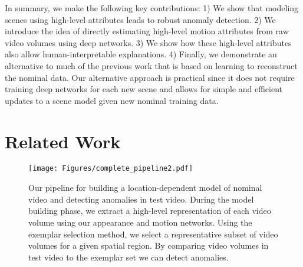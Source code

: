 In summary, we make the following key contributions:  1) We show that modeling scenes using high-level attributes leads to robust anomaly detection.
2) We introduce the idea of directly estimating high-level motion attributes from raw video volumes using deep networks.
3) We show how these high-level attributes also allow human-interpretable explanations.
4) Finally, we demonstrate an alternative to much of the previous work that is based on learning to reconstruct the nominal data.  Our alternative approach is practical since it does not require training deep networks for each new scene and allows for simple and efficient updates to a scene model given new nominal training data.






\section{Related Work}
\label{sec:related}

\begin{figure*}[]
    \centering
    \texttt{[image: Figures/complete\_pipeline2.pdf]}
    \vspace{-10pt}
    \caption{Our pipeline for building a location-dependent model of  nominal video and detecting anomalies in test video. During the model building phase, we extract a high-level representation of each video volume using our appearance and motion networks. Using the exemplar selection method, we select a representative subset of video volumes for a given spatial region. By comparing video volumes in test video to the exemplar set we can detect anomalies.
    }
    \label{fig:modelbuilding}
    \vspace{-10pt}
\end{figure*}

